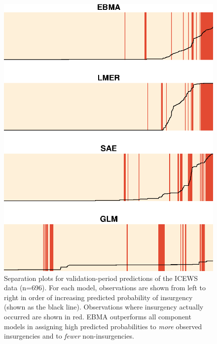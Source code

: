 \documentclass[12pt,fullpage,endnotes]{article}
\begin{document}
\begin{figure}[p]
 \caption{\footnotesize Separation plots for validation-period
    predictions of the ICEWS data (n=696).  For each model,
    observations are shown from left to right in order of increasing
    predicted probability of insurgency (shown as the black line).
    Observations where insurgency actually occurred are shown in
    red. EBMA outperforms all component models in assigning high
    predicted probabilities to \textit{more} observed insurgencies and
    to \textit{fewer} non-insurgencies.}
\label{InSam1sep}
\begin{center}
\includegraphics{Insample}
\end{center}
\end{figure}
\end{document}
